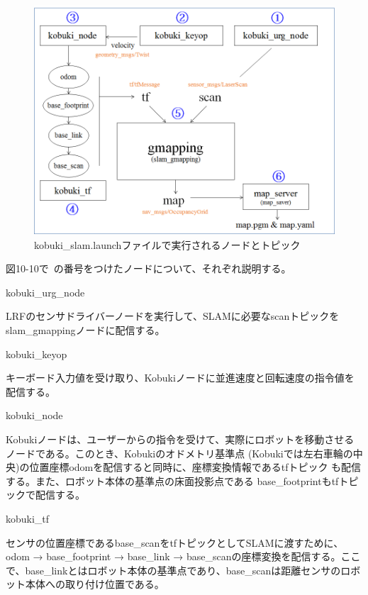 \begin{figure}[ht]
  \centering
  \includegraphics[width=\columnwidth]{pictures/chapter10/pic_10_10.png}
  \caption{kobuki\_slam.launchファイルで実行されるノードとトピック}
\end{figure}

図10-10で~の番号をつけたノードについて、それぞれ説明する。

\setcounter{num}{0}

\circled{\thenum} kobuki\_urg\_node

LRFのセンサドライバーノードを実行して、SLAMに必要なscanトピックをslam\_gmappingノードに配信する。

\circled{\thenum} kobuki\_keyop

キーボード入力値を受け取り、Kobukiノードに並進速度と回転速度の指令値を配信する。

\circled{\thenum} kobuki\_node

Kobukiノードは、ユーザーからの指令を受けて、実際にロボットを移動させるノードである。このとき、Kobukiのオドメトリ基準点 (Kobukiでは左右車輪の中央)の位置座標odomを配信すると同時に、座標変換情報であるtfトピック  も配信する。また、ロボット本体の基準点の床面投影点である  base\_footprintもtfトピックで配信する。

\circled{\thenum} kobuki\_tf

センサの位置座標であるbase\_scanをtfトピックとしてSLAMに渡すために、odom → base\_footprint → base\_link → base\_scanの座標変換を配信する。ここで、base\_linkとはロボット本体の基準点であり、base\_scanは距離センサのロボット本体への取り付け位置である。

